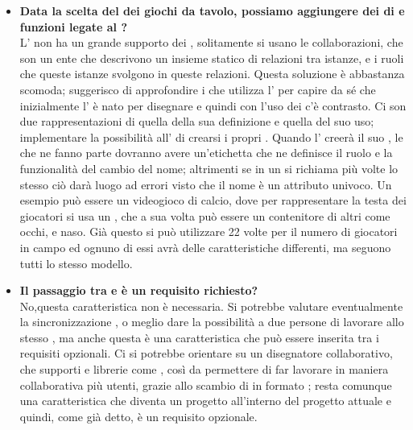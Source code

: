 \begin{itemize}
	   	\item 
	   		\textbf{Data la scelta del  dei giochi da tavolo, possiamo aggiungere dei  di  e funzioni legate al ?} \\
	    	\justifying     		
L' non ha un grande supporto dei , solitamente si usano le collaborazioni, che son un ente che descrivono un insieme statico di relazioni tra istanze, e i ruoli che queste istanze svolgono in queste relazioni. Questa soluzione è abbastanza scomoda; suggerisco di approfondire i  che utilizza l' per capire da sé che inizialmente l' è nato per disegnare  e quindi con l'uso dei  c'è contrasto. 
Ci son due rappresentazioni di  quella della sua definizione e quella del suo uso; implementare la possibilità all' di crearsi i propri . Quando l' creerà il suo , le  che ne fanno parte dovranno avere un'etichetta che ne definisce il ruolo e la funzionalità del cambio del nome; altrimenti se in un  si richiama più volte lo stesso  ciò darà luogo ad errori visto che il nome è un attributo univoco. Un esempio può essere un videogioco di calcio, dove per rappresentare la testa dei giocatori si usa un , che a sua volta può essere un contenitore di altri  come occhi, e naso. Già questo  si può utilizzare 22 volte per il numero di giocatori in campo ed ognuno di essi avrà delle caratteristiche differenti, ma seguono tutti lo stesso modello.
\\
	  		   	\item 
	   		\textbf{Il passaggio tra  e  è un requisito richiesto?} \\
	    	\justifying     		
No,questa caratteristica non è necessaria. Si potrebbe valutare eventualmente la sincronizzazione , o meglio dare la possibilità a due persone di lavorare allo stesso , ma anche questa è una caratteristica che può essere inserita tra i requisiti opzionali. Ci si potrebbe orientare su un disegnatore collaborativo, che supporti  e librerie come , così da permettere di far lavorare in maniera collaborativa più utenti, grazie allo scambio di  in formato ; resta comunque una caratteristica che diventa un progetto all'interno del progetto attuale e quindi, come già detto, è un requisito opzionale.

\end{itemize}
